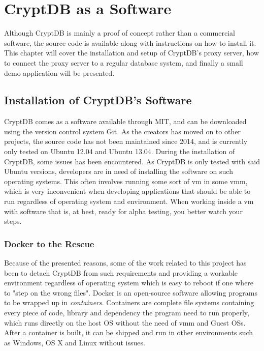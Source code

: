 \chapter{CryptDB as a Software}
\label{chp:software}

Although CryptDB is mainly a proof of concept rather than a commercial software, the source code is available along with instructions on how to install it. This chapter will cover the installation and setup of CryptDB's proxy server, how to connect the proxy server to a regular database system, and finally a small demo application will be presented.

\section{Installation of CryptDB's Software}

CryptDB comes as a software available through MIT, and can be downloaded using the version control system Git. As the creators has moved on to other projects, the source code has not been maintained since 2014, and is currently only tested on Ubuntu 12.04 and Ubuntu 13.04. During the installation of CryptDB, some issues has been encountered. As CryptDB is only tested with said Ubuntu versions, developers are in need of installing the software on such operating systems. This often involves running some sort of \gls{vm} in some \gls{vmm}, which is very inconvenient when developing applications that should be able to run regardless of operating system and environment. When working inside a \gls{vm} with software that is, at best, ready for alpha testing, you better watch your steps. 

\subsection{Docker to the Rescue}

Because of the presented reasons, some of the work related to this project has been to detach CryptDB from such requirements and providing a workable environment regardless of operating system which is easy to reboot if one where to "step on the wrong files". Docker \cite{docker_homepage} is an open-source software allowing programs to be wrapped up in \emph{containers}. Containers are complete file systems containing every piece of code, 
library and dependency the program need to run properly, which runs directly on the host OS without the need of \gls{vmm} and Guest OSs. After a container is built, it can be shipped and run in other environments such as Windows, OS X and Linux without issues.

